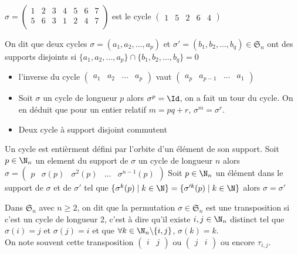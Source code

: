 \begin{ex}
$\sigma=\begin{pmatrix}
1 &2 &3 &4 &5 &6 &7\\
5 &6 & 3 & 1 & 2& 4 & 7\\
\end{pmatrix}$ est le cycle $\begin{pmatrix}
1&5&2&6&4
\end{pmatrix}$
\end{ex}
\begin{defini}
    On dit que deux cycles $\sigma=(a_1,a_2,\dots,a_p)$ et $\sigma'=(b_1,b_2,\dots,b_q)\in\mathfrak{S}_n$ ont des supports disjoints si
    $\{a_1,a_2,\dots,a_p\}\cap\{b_1,b_2,\dots,b_q\}=0$
\end{defini}
\begin{prop}
\begin{itemize}
\item l'inverse du cycle $\begin{pmatrix}
    a_1&a_2&\dots &a_p
\end{pmatrix}$ vaut $\begin{pmatrix}
a_p&a_{p-1}&\dots &a_1
\end{pmatrix}$
\item Soit $\sigma$ un cycle de longueur $p$ alors $\sigma^p=\Id$, on a fait un tour du cycle.
On en déduit que pour un entier relatif $m=pq+r$, $\sigma^m=\sigma^r$.
\item Deux cycle à support disjoint commutent
\end{itemize}
\end{prop}
\begin{prop}
    Un cycle est entièrment défini par l'orbite d'un élément de son support.
    \tcblower
    Soit $p\in\N_n$ un element du support de $\sigma$ un cycle de longueur $n$ alors $\sigma=\begin{pmatrix}
        p& \sigma(p)& \sigma^2(p)&\dots &\sigma^{n-1}(p)
    \end{pmatrix}$
    Soit $p\in\N_n$ un élément dans le support de $\sigma$ et de $\sigma'$ tel que $\{\sigma^k(p)\mid k\in\N\}=\{\sigma'^k(p)\mid k\in\N\}$ alors $\sigma=\sigma'$
\end{prop}
\begin{defini}[Transposition]
Dans $\mathfrak{S}_n$ avec $n\geq 2$, on dit que la permutation $\sigma\in\mathfrak{S}_n$ est une transposition si c'est un cycle de longueur 2, c'est à dire qu'il existe $i,j\in\N_n$ distinct tel que $\sigma(i)=j$ et $\sigma(j)=i$ et que $\forall k\in\N_n\backslash\{i,j\}$, $\sigma(k)=k$.\\
On note souvent cette transposition $\begin{pmatrix}
i & j
\end{pmatrix}$ ou $\begin{pmatrix}
j & i
\end{pmatrix}$ ou encore $\tau_{i,j}$.
\end{defini}

